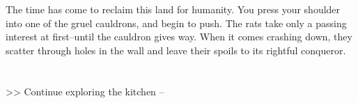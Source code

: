 The time has come to reclaim this land for humanity. You press your shoulder into one of the gruel cauldrons, and begin to push. The rats take only a passing interest at first--until the cauldron gives way. When it comes crashing down, they scatter through holes in the wall and leave their spoils to its rightful conqueror.\\
\\
\\

>> Continue exploring the kitchen -- 
